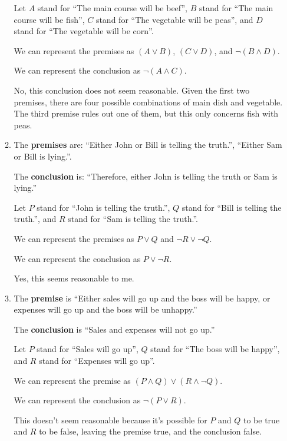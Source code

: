 \documentclass{article}
\begin{document}
\begin{enumerate}
\begin{enumerate}
    Let $A$ stand for ``The main course will be beef'', $B$ stand for ``The main course will be fish'', $C$ stand for ``The vegetable will be peas'', and $D$ stand for ``The vegetable will be corn''.

    We can represent the premises as $(A \lor B)$, $(C \lor D)$, and $\lnot (B \land D)$.

    We can represent the conclusion as $\lnot (A \land C)$.

    No, this conclusion does not seem reasonable.  Given the first two premises, there are four possible combinations of main dish and vegetable.  The third premise rules out one of them, but this only concerns fish with peas.

  \item The \textbf{premises} are: ``Either John or Bill is telling the truth.'', ``Either Sam or Bill is lying.''.

    The \textbf{conclusion} is: ``Therefore, either John is telling the truth or Sam is lying.''

    Let $P$ stand for ``John is telling the truth.'', $Q$ stand for ``Bill is telling the truth.'', and $R$ stand for ``Sam is telling the truth.''.

    We can represent the premises as $P \lor Q$ and $\lnot R \lor \lnot Q$.

    We can represent the conclusion as $P \lor \lnot R$.

    Yes, this seems reasonable to me.

  \item
    The \textbf{premise} is ``Either sales will go up and the boss will be happy, or expenses will go up and the boss will be unhappy.''

    The \textbf{conclusion} is ``Sales and expenses will not go up.''

    Let $P$ stand for ``Sales will go up'', $Q$ stand for ``The boss will be happy'', and $R$ stand for ``Expenses will go up''.

    We can represent the premise as $(P \land Q) \lor (R \land \lnot Q)$.

    We can represent the conclusion as $\lnot (P \lor R)$.

    This doesn't seem reasonable because it's possible for $P$ and $Q$ to be true and $R$ to be false, leaving the premise true, and the conclusion false.
    \end{enumerate}
\end{enumerate}
\end{document}
